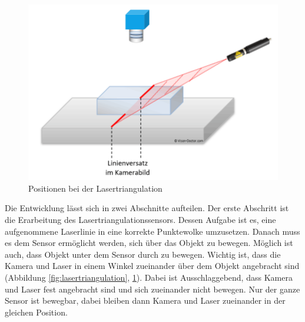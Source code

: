 	\newpage
	
	\begin{figure}[h]
		\centering
		\includegraphics[width=0.6\linewidth]{img/grundlagen/lasertriangulation_2}
		\caption{Positionen bei der Lasertriangulation}
		\label{fig:lasertriangulation_position}
	\end{figure}
	
	Die Entwicklung lässt sich in zwei Abschnitte aufteilen. Der erste Abschritt ist die Erarbeitung des Lasertriangulationssensors. Dessen Aufgabe ist es, eine aufgenommene Laserlinie in eine korrekte Punktewolke umzusetzen. Danach muss es dem Sensor ermöglicht werden, sich über das Objekt zu bewegen. Möglich ist auch, dass Objekt unter dem Sensor durch zu bewegen. \newline
	Wichtig ist, dass die Kamera und Laser in einem Winkel zueinander über dem Objekt angebracht sind (Abbildung \ref{fig:lasertriangulation}, \ref{fig:lasertriangulation_position}). Dabei ist Ausschlaggebend, dass Kamera und Laser fest angebracht sind und sich zueinander nicht bewegen. Nur der ganze Sensor ist bewegbar, dabei bleiben dann Kamera und Laser zueinander in der gleichen Position.
	\label{chap:grundlegender_aufbau}
	
